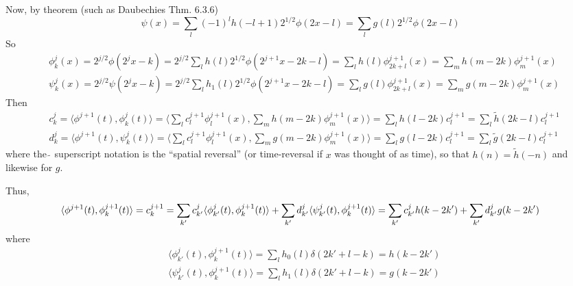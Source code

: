 \documentclass[twoside]{amsart}
\theoremstyle{plain}
\theoremstyle{definition}
\theoremstyle{remark}
\numberwithin{equation}{section}
\begin{document}
Now, by theorem (such as Daubechies Thm. 6.3.6)
\begin{equation}\label{Eq:psiinV^1}
\psi(x) = \sum_l(-1)^l h(-l+1)2^{1/2} \phi(2x-l) = \sum_l g(l) 2^{1/2} \phi(2x-l)
\end{equation}
So
\[
\begin{aligned}
  & \phi^j_k(x) = 2^{j/2}\phi(2^jx - k ) = 2^{j/2} \sum_l h(l)2^{1/2} \phi(2^{j+1}x-2k-l) = \sum_l h(l) \phi^{j+1}_{2k+l}(x) = \sum_m h(m-2k) \phi^{j+1}_m(x)   \\ 
  & \psi_k^j(x) = 2^{j/2}\psi(2^jx-k) = 2^{j/2}\sum_l h_1(l) 2^{1/2}\phi(2^{j+1}x - 2k-l) = \sum_l g(l) \phi^{j+1}_{2k+l}(x)  = \sum_m g(m-2k) \phi^{j+1}_m(x)
\end{aligned}
\]
Then
\begin{equation}\label{Eq:c^j_kd^j_k00}
\begin{aligned}
&  c^j_k = \langle \phi^{j+1}(t), \phi^j_k(t) \rangle = \langle \sum_l c_l^{j+1}\phi_l^{j+1}(x) , \sum_m h(m-2k) \phi_m^{j+1}(x) \rangle 
 = \sum_l h(l-2k) c^{j+1}_{l } = \sum_l \widetilde{h}(2k-l) c^{j+1}_l \\  %
& d_k^j = \langle \phi^{j+1}(t), \psi_k^j(t) \rangle  = \langle \sum_l c_l^{j+1}\phi_l^{j+1}(x) , \sum_m g(m-2k) \phi_m^{j+1}(x) \rangle 
 = \sum_l g(l-2k) c^{j+1}_{l } = \sum_l \widetilde{g}(2k-l) c^{j+1}_l
\end{aligned}
\end{equation}
where the $\widetilde{\,}$ superscript notation is the ``spatial reversal'' (or time-reversal if $x$ was thought of as time), so that $h(n) = \widetilde{h}(-n)$ and likewise for $g$.  

Thus,
\begin{equation}\label{Eq:c^{j+1}_k00}
\begin{gathered}
  \langle \phi^{j+1}(t), \phi^{j+1}_k(t) \rangle = c_k^{j+1} = \sum_{k'}c_{k'}^j \langle \phi^j_{k'}(t) , \phi^{j+1}_k(t) \rangle + \sum_{k'} d^j_{k'} \langle \psi_{k'}^j(t), \phi^{j+1}_k(t) \rangle = \sum_{k'} c_{k'}^j h(k-2k') + \sum_{k'} d_{k'}^jg(k-2k')
\end{gathered}
\end{equation}
where 
\[
\begin{aligned}
  & \langle \phi^j_{k'}(t), \phi_k^{j+1}(t) \rangle = \sum_l h_0(l) \delta(2k' + l-k) = h(k-2k') \\ 
  & \langle \psi^j_{k'}(t), \phi^{j+1}_k(t) \rangle =\sum_l h_1(l) \delta(2k'+l -k) = g(k-2k')
\end{aligned}
\]
\end{document}
